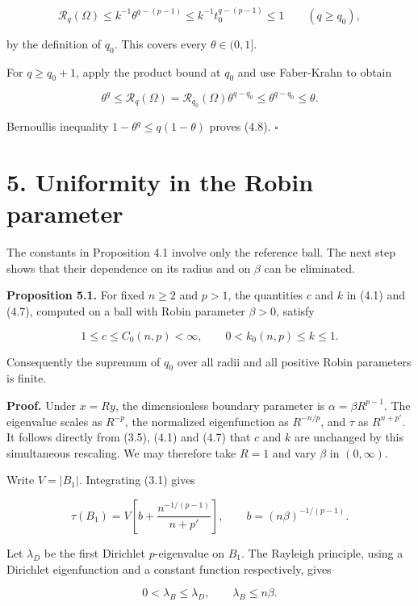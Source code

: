 \documentclass[11pt]{article}
\begin{document}
\[\mathcal R_q(\Omega)\leq k^{-1}\theta^{q-(p-1)}
\leq k^{-1}t_0^{q-(p-1)}\leq1\qquad(q\geq q_0),\]

by the definition of \(q_0\). This covers every \(\theta\in(0,1]\).

For \(q\geq q_0+1\), apply the product bound at \(q_0\) and use
Faber-Krahn to obtain

\[\theta^q\leq\mathcal R_q(\Omega)
=\mathcal R_{q_0}(\Omega)\theta^{q-q_0}
\leq\theta^{q-q_0}\leq\theta.\]

Bernoulli\textquotesingle s inequality \(1-\theta^q\leq q(1-\theta)\)
proves (4.8). \(\square\)

\section{5. Uniformity in the Robin
parameter}\label{uniformity-in-the-robin-parameter}

The constants in Proposition 4.1 involve only the reference ball. The
next step shows that their dependence on its radius and on \(\beta\) can
be eliminated.

\textbf{Proposition 5.1.} For fixed \(n\geq2\) and \(p>1\), the
quantities \(c\) and \(k\) in (4.1) and (4.7), computed on a ball with
Robin parameter \(\beta>0\), satisfy

\[1\leq c\leq C_0(n,p)<\infty,
\qquad 0<k_0(n,p)\leq k\leq1.\tag{5.1}\]

Consequently the supremum of \(q_0\) over all radii and all positive
Robin parameters is finite.

\textbf{Proof.} Under \(x=Ry\), the dimensionless boundary parameter is
\(\alpha=\beta R^{p-1}\). The eigenvalue scales as \(R^{-p}\), the
normalized eigenfunction as \(R^{-n/p}\), and \(\tau\) as \(R^{n+p'}\).
It follows directly from (3.5), (4.1) and (4.7) that \(c\) and \(k\) are
unchanged by this simultaneous rescaling. We may therefore take \(R=1\)
and vary \(\beta\) in \((0,\infty)\).

Write \(V=|B_1|\). Integrating (3.1) gives

\[\tau(B_1)=V\left[b+\frac{n^{-1/(p-1)}}{n+p'}\right],
\qquad b=(n\beta)^{-1/(p-1)}.\tag{5.2}\]

Let \(\lambda_D\) be the first Dirichlet \(p\)-eigenvalue on \(B_1\).
The Rayleigh principle, using a Dirichlet eigenfunction and a constant
function respectively, gives

\[0<\lambda_B\leq\lambda_D,\qquad\lambda_B\leq n\beta.\tag{5.3}\]
\end{document}
